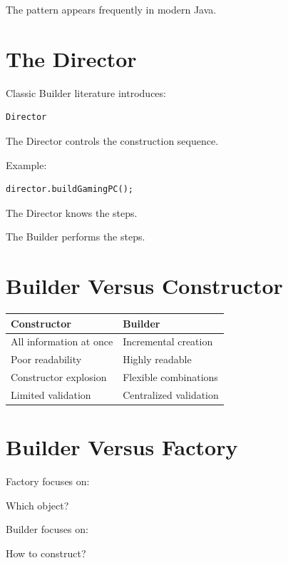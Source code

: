 \documentclass[11pt,a4paper]{book}
\begin{document}
The pattern appears frequently in modern Java.


\section{The Director}

Classic Builder literature introduces:

\begin{verbatim}
Director
\end{verbatim}

The Director controls the construction sequence.

Example:

\begin{verbatim}
director.buildGamingPC();
\end{verbatim}

The Director knows the steps.

The Builder performs the steps.


\section{Builder Versus Constructor}

\begin{center}
\begin{tabular}{|p{5cm}|p{5cm}|}
\hline
Constructor & Builder \\
\hline
All information at once & Incremental creation \\
\hline
Poor readability & Highly readable \\
\hline
Constructor explosion & Flexible combinations \\
\hline
Limited validation & Centralized validation \\
\hline
\end{tabular}
\end{center}


\section{Builder Versus Factory}

\begin{idea}

Factory focuses on:

\begin{center}
Which object?
\end{center}

Builder focuses on:

\begin{center}
How to construct?
\end{center}

\end{idea}
\end{document}
